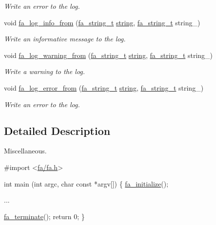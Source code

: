 \begin{DoxyCompactItemize}
\begin{DoxyCompactList}\small\item\em Write an error to the log. \end{DoxyCompactList}\item 
void \hyperlink{group___fa_utility_ga0c1973f20d36a9af40e69f4fb6237126}{fa\-\_\-log\-\_\-info\-\_\-from} (\hyperlink{group___fa_string_gacada63033b77bc6c39fa632ae199349b}{fa\-\_\-string\-\_\-t} \hyperlink{util_8h_a41106000aac73b61e4fc2ef9dd39a603}{string}, \hyperlink{group___fa_string_gacada63033b77bc6c39fa632ae199349b}{fa\-\_\-string\-\_\-t} string\-\_\-)
\begin{DoxyCompactList}\small\item\em Write an informative message to the log. \end{DoxyCompactList}\item 
void \hyperlink{group___fa_utility_gaa1508f7cf8794e99da97612ac76e694b}{fa\-\_\-log\-\_\-warning\-\_\-from} (\hyperlink{group___fa_string_gacada63033b77bc6c39fa632ae199349b}{fa\-\_\-string\-\_\-t} \hyperlink{util_8h_a41106000aac73b61e4fc2ef9dd39a603}{string}, \hyperlink{group___fa_string_gacada63033b77bc6c39fa632ae199349b}{fa\-\_\-string\-\_\-t} string\-\_\-)
\begin{DoxyCompactList}\small\item\em Write a warning to the log. \end{DoxyCompactList}\item 
void \hyperlink{group___fa_utility_gad90cd8e846dfbeabe3572e2e4f842204}{fa\-\_\-log\-\_\-error\-\_\-from} (\hyperlink{group___fa_string_gacada63033b77bc6c39fa632ae199349b}{fa\-\_\-string\-\_\-t} \hyperlink{util_8h_a41106000aac73b61e4fc2ef9dd39a603}{string}, \hyperlink{group___fa_string_gacada63033b77bc6c39fa632ae199349b}{fa\-\_\-string\-\_\-t} string\-\_\-)
\begin{DoxyCompactList}\small\item\em Write an error to the log. \end{DoxyCompactList}\end{DoxyCompactItemize}


\subsection{Detailed Description}
Miscellaneous. 
\begin{DoxyCode}
\textcolor{preprocessor}{#import <\hyperlink{fa_2fa_8h}{fa/fa.h}>}

\textcolor{keywordtype}{int} main (\textcolor{keywordtype}{int} argc, \textcolor{keywordtype}{char} \textcolor{keyword}{const} *argv[])
\{
    \hyperlink{group___fa_utility_ga061c945c3f013c84561593911b661a44}{fa\_initialize}();

    ...

    \hyperlink{group___fa_utility_ga66c7af3a85045329f71966dfe40a5acf}{fa\_terminate}();
    \textcolor{keywordflow}{return} 0;
\}
\end{DoxyCode}
 

